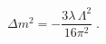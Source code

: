 \begin{equation}
\label{eq:masscor}
\Delta m^2 = -\frac{3\lambda \, \Lambda^2}{16\pi^2} \; .
\end{equation}

